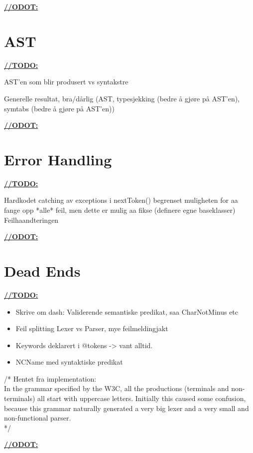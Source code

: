 \underline{\textbf{\LARGE //ODOT:}}

\section{AST}
\underline{\textbf{\LARGE //TODO:}}

AST'en som blir produsert vs syntakstre

Generelle resultat, bra/dårlig (AST, typesjekking (bedre å gjøre på AST'en),
symtabs (bedre å gjøre på AST'en))

\underline{\textbf{\LARGE //ODOT:}}

\section{Error Handling}
\underline{\textbf{\LARGE //TODO:}}

Hardkodet catching av exceptions i nextToken() begrenset muligheten for aa
fange opp *alle* feil, men dette er mulig aa fikse (definere egne baseklasser)
Feilhaandteringen

\underline{\textbf{\LARGE //ODOT:}}

\section{Dead Ends}
\underline{\textbf{\LARGE //TODO:}}

\begin{itemize}
\item Skrive om dash: Validerende semantiske predikat, saa CharNotMinus etc
\item Feil splitting Lexer vs Parser, mye feilmeldingjakt
\item Keywords deklarert i @tokens -> vant alltid.

\item NCName med syntaktiske predikat
\end{itemize}

/* Hentet fra implementation: \\
In the grammar specified by the W3C, all the productions (terminals and
non-terminals) all start with uppercase letters. Initially this caused some
confusion, because this grammar naturally generated a very big lexer and a very
small and non-functional parser. \\
*/

\underline{\textbf{\LARGE //ODOT:}}


